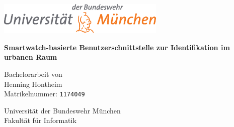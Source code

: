 
\newcommand{\content}{
	\vspace*{1cm}
	
	\includegraphics[width=0.6\textwidth]{./images/unibw_athene_neu}
	
	\vspace{1.5cm}
	{\Huge %
		\textbf{Smartwatch-basierte Benutzerschnittstelle zur Identifikation im urbanen Raum}\\ %
	} %
	\vspace{1.5cm}
	
	
	{\Large
		Bachelorarbeit von\\
		Henning Hontheim\\
		Matrikelnummer: \texttt{1174049}\\
}}


\thispagestyle{empty}

\begin{center}

\content

\vspace{1cm}
%

\vfill

{\Large %
Universität der Bundeswehr München\\
Fakultät für Informatik\\
}


\end{center}

\newpage


\thispagestyle{empty}
\cleardoublepage


\thispagestyle{empty}

